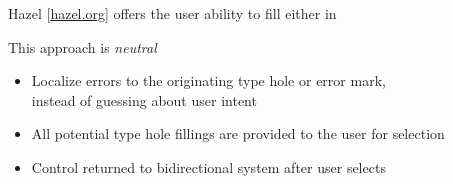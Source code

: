 \begin{frame}[fragile]
  \begin{center}
    \vspace{2em}
  \end{center}

  Hazel \textcolor{BrickRed}{\small[\href{https://hazel.org}{hazel.org}]}
  offers the user ability to fill either in

\end{frame}

\begin{frame}
  This approach is \emph{neutral}

  \vspace{1em}
  \pause
  \begin{itemize}
    \item Localize errors to the originating type hole or error mark\pause, \\
      instead of guessing about user intent

      \pause
    \item All potential type hole fillings are provided to the user for selection

      \pause
    \item Control returned to bidirectional system after user selects
  \end{itemize}
\end{frame}
